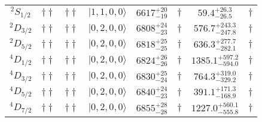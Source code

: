\begin{tabular}{c| c c c c c c c}
$^{2}S_{1/2}$ & $\dagger\dagger$ & $\dagger\dagger$ & $\vert 1,1,0,0 \rangle $ & $6617^{+20}_{-19}$ & $\dagger$ & $59.4^{+26.3}_{-26.5}$ & $\dagger$ \\ 
$^{2}D_{3/2}$ & $\dagger\dagger$ & $\dagger\dagger$ & $\vert 0,2,0,0 \rangle $ & $6808^{+24}_{-23}$ & $\dagger$ & $576.7^{+243.3}_{-247.8}$ & $\dagger$ \\ 
$^{2}D_{5/2}$ & $\dagger\dagger$ & $\dagger\dagger$ & $\vert 0,2,0,0 \rangle $ & $6818^{+25}_{-25}$ & $\dagger$ & $636.3^{+277.7}_{-282.1}$ & $\dagger$ \\ 
$^{4}D_{1/2}$ & $\dagger\dagger$ & $\dagger\dagger$ & $\vert 0,2,0,0 \rangle $ & $6824^{+26}_{-26}$ & $\dagger$ & $1385.1^{+597.2}_{-594.0}$ & $\dagger$ \\ 
$^{4}D_{3/2}$ & $\dagger\dagger$ & $\dagger\dagger$ & $\vert 0,2,0,0 \rangle $ & $6830^{+25}_{-24}$ & $\dagger$ & $764.3^{+319.0}_{-329.2}$ & $\dagger$ \\ 
$^{4}D_{5/2}$ & $\dagger\dagger$ & $\dagger\dagger$ & $\vert 0,2,0,0 \rangle $ & $6840^{+24}_{-23}$ & $\dagger$ & $391.1^{+171.3}_{-168.9}$ & $\dagger$ \\ 
$^{4}D_{7/2}$ & $\dagger\dagger$ & $\dagger\dagger$ & $\vert 0,2,0,0 \rangle $ & $6855^{+28}_{-28}$ & $\dagger$ & $1227.0^{+560.1}_{-555.8}$ & $\dagger$ \\ 
\hline \hline
\end{tabular}

